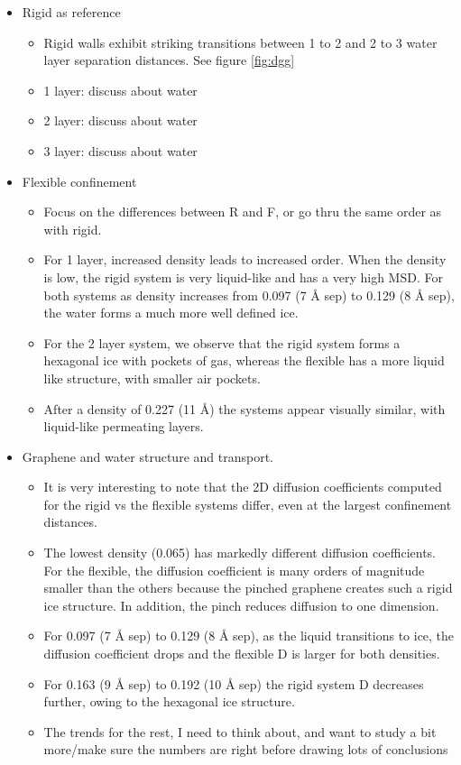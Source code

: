 \documentclass[12pt]{article}
\begin{document}
\clearpage

\begin{itemize}
	\item Rigid as reference
	\begin{itemize}
		\item Rigid walls exhibit striking transitions between 1 to 2 and 2 to 3 water layer separation distances.
		         See figure \ref{fig:dgg}
		\item 1 layer: discuss about water
		\item 2 layer: discuss about water
		\item 3 layer: discuss about water
	\end{itemize}
	\item Flexible confinement
	\begin{itemize}
		\item Focus on the differences between R and F, or go thru the same order as with rigid.
		\item For 1 layer, increased density leads to increased order. When the density is low, the rigid system is 
		         very liquid-like and has a very high MSD. For both systems as density increases from 0.097 
		         (7 \r A sep) to 0.129 (8 \r A sep), the water forms a much more well defined ice.
		\item For the 2 layer system, we observe that the rigid system forms a hexagonal ice with pockets of gas, 
			whereas the flexible has a more liquid like structure, with smaller air pockets.
		\item After a density of 0.227 (11 \r A) the systems appear visually similar, with liquid-like permeating layers.
	\end{itemize}
	\item Graphene and water structure and transport. 
	\begin{itemize}
		\item It is very interesting to note that the 2D diffusion coefficients computed for the rigid vs the flexible 
			systems differ, even at the largest confinement distances. 
		\item The lowest density (0.065) has markedly different diffusion coefficients. For the flexible, the diffusion coefficient is many orders of magnitude smaller than the others because the pinched graphene creates such a rigid ice structure. In addition, the pinch reduces diffusion to one dimension.
		\item For 0.097 (7 \r A sep) to 0.129 (8 \r A sep), as the liquid transitions to ice, the diffusion coefficient drops and the flexible D is larger for both densities.
		\item For 0.163 (9 \r A sep) to 0.192 (10 \r A sep) the rigid system D decreases further, owing to the hexagonal ice structure.
		\item The trends for the rest, I need to think about, and want to study a bit more/make sure the numbers are right before drawing lots of conclusions
	\end{itemize}
\end{itemize}  
\end{document}
